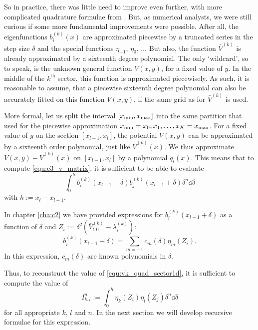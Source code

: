 So in practice, there was little need to improve even further, with more complicated quadrature formulae from \cite{ixaru_operations_1997,kim_quadrature_2002,conte_modified_2016}. But, as numerical analysts, we were still curious if some more fundamental improvements were possible. After all, the eigenfunctions $b_i^{(k)}(x)$ are approximated piecewise by a truncated series in the step size $\delta$ and the special functions $\eta_{-1}$, $\eta_{0}$, $\dots$ But also, the function $\bar{V}^{(k)}$ is already approximated by a sixteenth degree polynomial. The only `wildcard', so to speak, is the unknown general function $V(x, y)$, for a fixed value of $y$. In the middle of the $k^\text{th}$ sector, this function is approximated piecewisely. As such, it is reasonable to assume, that a piecewise sixteenth degree polynomial can also be accurately fitted on this function $V(x, y)$, if the same grid as for $\bar{V}^{(k)}$ is used.

More formal, let us split the interval $[{x_{\text{min}}}, {x_{\text{max}}}]$ into the same partition that  used for the piecewise approximation ${x_{\text{min}}} = x_0, x_1, \dots, x_K = {x_{\text{max}}}$. For a fixed value of $y$ on the section $[x_{l-1}, x_l]$, the potential $V(x, y)$ can be approximated by a sixteenth order polynomial, just like $\bar{V}^{(k)}(x)$. We thus approximate $V(x, y) - \bar{V}^{(k)}(x)$ on $[x_{l-1}, x_l]$ by a polynomial $q_l(x)$. This means that to compute \eqref{equ:c3_v_matrix}, it is sufficient to be able to evaluate
\begin{equation}\label{equ:vk_quad_sector1d}
  \int_{0}^{h} b_i^{(k)}(x_{l-1}+\delta)b_j^{(k)}(x_{l-1}+\delta)\delta^n\dd \delta
\end{equation}
with $h := x_l-x_{l-1}$.

In chapter \ref{cha:c2} we have provided expressions for $b_i^{(k)}(x_{l-1}+\delta)$ as a function of $\delta$ and $Z_i := \delta^2\left(\bar{V}^{(k)}_{l,0}- \lambda^{(k)}_i\right)$:
$$
  b_i^{(k)}(x_{l-1}+\delta) = \sum_{m=-1} c_m(\delta) \eta_m(Z_i)\text{.}
$$
In this expression, $c_m(\delta)$ are known polynomials in $\delta$.

Thus, to reconstruct the value of \eqref{equ:vk_quad_sector1d}, it is sufficient to compute the value of
\begin{equation}\label{equ:c3_eta_eta_inegral}
  I_{k,l}^n := \int_0^h \eta_k(Z_i) \eta_l(Z_j) \delta^n \dd \delta
\end{equation}
for all appropriate $k$, $l$ and $n$. In the next section we will develop recursive formulae for this expression.

